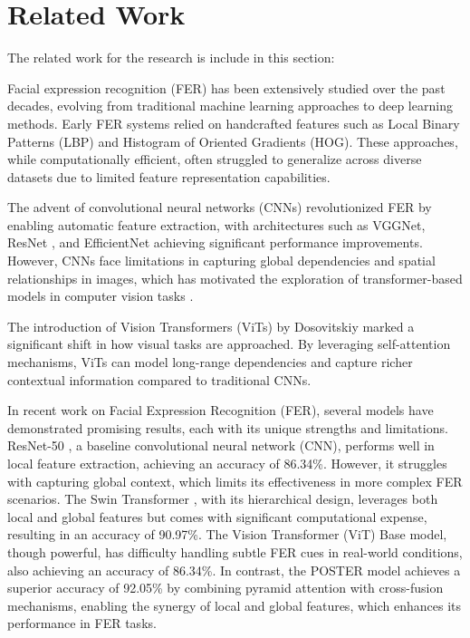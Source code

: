 \section{Related Work}
The related work for the research is include in this section:

Facial expression recognition (FER) has been extensively studied over the past decades, evolving from traditional machine learning approaches to deep learning methods. Early FER systems relied on handcrafted features such as Local Binary Patterns (LBP) and Histogram of Oriented Gradients (HOG). These approaches, while computationally efficient, often struggled to generalize across diverse datasets due to limited feature representation capabilities. 

The advent of convolutional neural networks (CNNs) revolutionized FER by enabling automatic feature extraction, with architectures such as VGGNet, ResNet \cite{he_deep_2015}, and EfficientNet achieving significant performance improvements. However, CNNs face limitations in capturing global dependencies and spatial relationships in images, which has motivated the exploration of transformer-based models in computer vision tasks \cite{islam_recent_2023}.

The introduction of Vision Transformers (ViTs) by Dosovitskiy \cite{dosovitskiy_image_2021} marked a significant shift in how visual tasks are approached. By leveraging self-attention mechanisms, ViTs can model long-range dependencies and capture richer contextual information compared to traditional CNNs.


In recent work on Facial Expression Recognition (FER), several models have demonstrated promising results, each with its unique strengths and limitations. ResNet-50 \cite{he_deep_2015} , a baseline convolutional neural network (CNN), performs well in local feature extraction, achieving an accuracy of 86.34\%. However, it struggles with capturing global context, which limits its effectiveness in more complex FER scenarios. The Swin Transformer \cite{liu_swin_2021}, with its hierarchical design, leverages both local and global features but comes with significant computational expense, resulting in an accuracy of 90.97\%. The Vision Transformer (ViT) Base \cite{dosovitskiy_image_2021} model, though powerful, has difficulty handling subtle FER cues in real-world conditions, also achieving an accuracy of 86.34\%. In contrast, the POSTER model \cite{zheng_poster_2022} achieves a superior accuracy of 92.05\% by combining pyramid attention with cross-fusion mechanisms, enabling the synergy of local and global features, which enhances its performance in FER tasks. 


